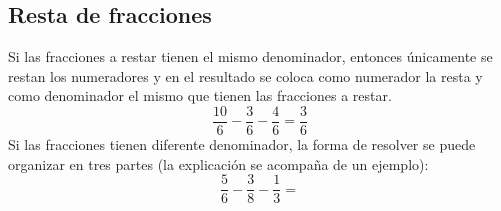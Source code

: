 \subsection{Resta de fracciones}
Si las fracciones a restar tienen el mismo denominador, entonces únicamente se restan los numeradores y en el resultado se coloca como numerador la resta y como denominador el mismo que tienen las fracciones a restar.
\begin{equation*}
\dfrac{10}{6}-\dfrac{3}{6}-\dfrac{4}{6}=\dfrac{3}{6}
\end{equation*}
Si las fracciones tienen diferente denominador, la forma de resolver se puede organizar en tres partes (la explicación se acompaña de un ejemplo):
\begin{equation*}
\dfrac{5}{6}-\dfrac{3}{8}-\dfrac{1}{3}=
\end{equation*}
